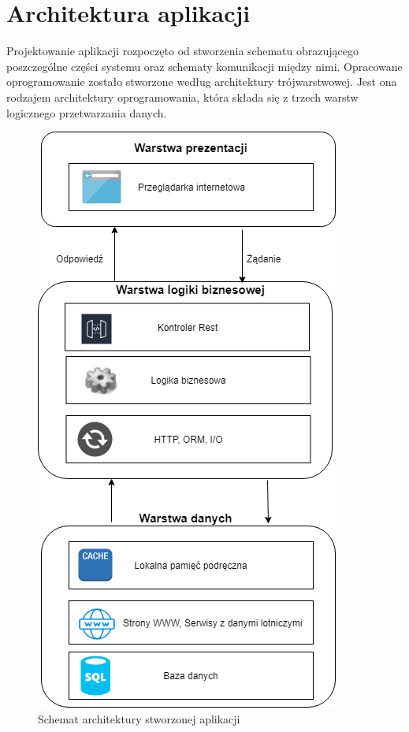 \documentclass[12pt, twoside]{report}
\begin{document}
\section{Architektura aplikacji}
Projektowanie aplikacji rozpoczęto od stworzenia schematu obrazującego poszczególne części systemu oraz schematy komunikacji między nimi. Opracowane oprogramowanie zostało stworzone według architektury trójwarstwowej. Jest ona rodzajem architektury oprogramowania, która składa się z trzech warstw logicznego przetwarzania danych. 

\begin{figure}[!ht]
\centering
\includegraphics[scale=0.60, keepaspectratio]{architecure_diagram.png}
\caption{Schemat architektury stworzonej aplikacji}
\label{fig:architecure_diagram}
\end{figure}
\end{document}
